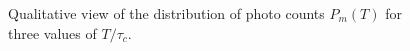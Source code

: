 \begin{figure}
\centering



\caption{Qualitative view of the distribution of photo counts
  $P_m\left(T\right)$ for three values of $T/\tau_c$.}
\label{figPart4Ch2_6}
\end{figure}